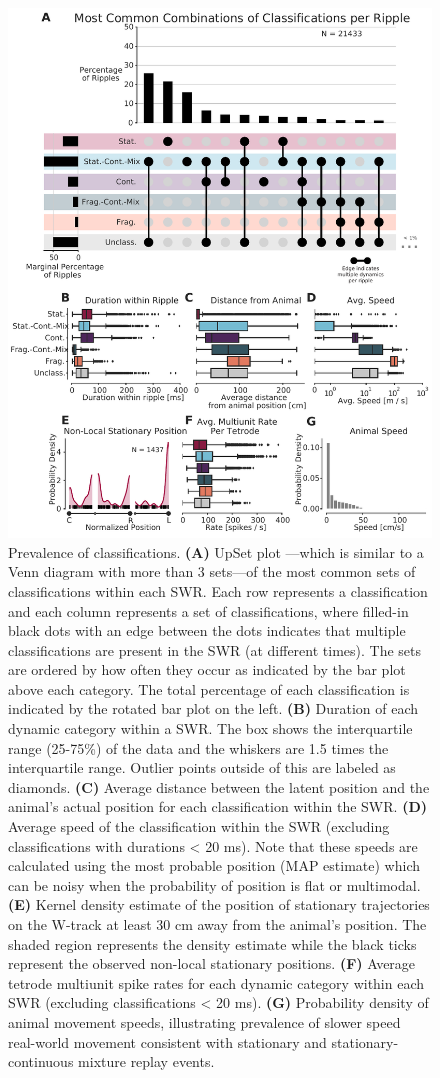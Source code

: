 \documentclass[9pt,lineno]{elife}
\begin{document}
\begin{figure}
\includegraphics[width=0.80\linewidth]{figures/Figure5/Figure5_v6}
\caption{
Prevalence of classifications. \textbf{(A)} UpSet plot \citep{LexUpSetVisualizationIntersecting2014}---which is similar to a Venn diagram with more than 3 sets---of the most common sets of classifications within each SWR. Each row represents a classification and each column represents a set of classifications, where filled-in black dots with an edge between the dots indicates that multiple classifications are present in the SWR (at different times). The sets are ordered by how often they occur as indicated by the bar plot above each category. The total percentage of each classification is indicated by the rotated bar plot on the left. \textbf{(B)} Duration of each dynamic category within a SWR. The box shows the interquartile range (25-75\%) of the data and the whiskers are 1.5 times the interquartile range. Outlier points outside of this are labeled as diamonds. \textbf{(C)} Average distance between the latent position and the animal's actual position for each classification within the SWR. \textbf{(D)} Average speed of the classification within the SWR (excluding classifications with durations < 20 ms). Note that these speeds are calculated using the most probable position (MAP estimate) which can be noisy when the probability of position is flat or multimodal.\textbf{(E)} Kernel density estimate of the position of stationary trajectories on the W-track at least 30 cm away from the animal's position. The shaded region represents the density estimate while the black ticks represent the observed non-local stationary positions. \textbf{(F)} Average tetrode multiunit spike rates for each dynamic category within each SWR (excluding classifications < 20 ms). \textbf{(G)} Probability density of animal movement speeds, illustrating prevalence of slower speed real-world movement consistent with stationary and stationary-continuous mixture replay events. 
}
\label{fig:5}


\end{figure}
\end{document}
